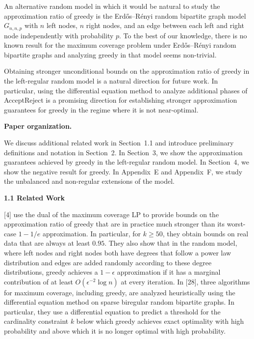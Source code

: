 An alternative random model in which it would be natural to study the approximation ratio of greedy is the Erdős–Rényi
random bipartite graph model $G_{n,n,p}$ with $n$ left nodes, $n$ right nodes, and an edge between each left and right node independently with probability $p$. To the best of our knowledge, there is no known result for the maximum coverage problem under Erdős–Rényi
random bipartite graphs and analyzing greedy in that model seems non-trivial.\par




Obtaining stronger unconditional bounds on the approximation ratio of greedy in the left-regular random model is a natural direction for future work. In particular, using the differential equation method to analyze additional phases of AcceptReject is a promising direction for establishing stronger approximation guarantees for greedy in the regime where it is not near-optimal.\par





\par\medskip\noindent\textbf{Paper organization.}\par




We discuss additional related work in Section 1.1 and introduce preliminary definitions and notation in Section 2. In Section 3, we show the approximation guarantees achieved by greedy in the left-regular random model. In Section 4, we show the negative result for greedy. In Appendix E and Appendix F, we study the unbalanced and non-regular extensions of the model.\par





\par\medskip\noindent\textbf{1.1 Related Work}\par




[4] use the dual of the maximum coverage LP to provide bounds on the approximation ratio of greedy that are in practice much stronger than its worst-case $1-1/e$ approximation. In particular, for $k\geq 50$, they obtain bounds on real data that are always at least $0.95$. They also show that in the random model, where left nodes and right nodes both have degrees that follow a power law distribution and edges are added randomly according to these degree distributions, greedy achieves a $1-\epsilon$ approximation if it has a marginal contribution of at least $O(\epsilon^{-2}\log n)$ at every iteration. In [28], three algorithms for maximum coverage, including greedy, are analyzed heuristically using the differential equation method on sparse biregular random bipartite graphs. In particular, they use a differential equation to predict a threshold for the cardinality constraint $k$ below which greedy achieves exact optimality with high probability and above which it is no longer optimal with high probability.\par




